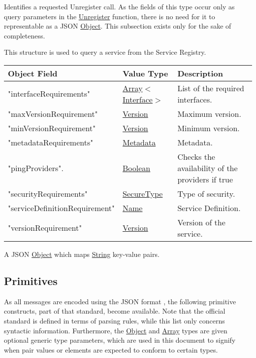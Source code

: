 \documentclass[a4paper]{arrowhead}
\newcommand{\oref}[1]{{\textcolor{ArrowheadBlue}{\hyperref[sec:operations:#1]{#1}}}}
\newcommand{\pref}[1]{{\textcolor{ArrowheadGrey}{\hyperref[sec:model:primitives:#1]{#1}}}}
\begin{document}

Identifies a requested Unregister call.
As the fields of this type occur only as query parameters in the \oref{Unregister} function, there is no need for it to representable as a JSON \pref{Object}.
This subsection exists only for the sake of completeness.


This structure is used to query a service from the Service Registry.

\begin{table}[ht!]
\begin{tabularx}{\textwidth}{| p{5cm} | p{3.5cm} | X |} \hline
\rowcolor{gray!33} Object Field & Value Type      & Description \\ \hline
"interfaceRequirements"                   & \pref{Array}$<$\pref{Interface}$>$     & List of the required interfaces. \\ \hline
"maxVersionRequirement"                & \pref{Version}     & Maximum version. \\ \hline
"minVersionRequirement"                & \pref{Version}     & Minimum version. \\ \hline
"metadataRequirements"                  & \pref{Metadata}     & Metadata. \\ \hline
"pingProviders".                    & \pref{Boolean} & Checks the availability of the providers if true \\ \hline
"securityRequirements"                    &\pref{SecureType}  & Type of security. \\ \hline
"serviceDefinitionRequirement"         &\pref{Name}        & Service Definition. \\ \hline
"versionRequirement"                   &\pref{Version}     & Version of the service. \\ \hline
\end{tabularx}
\end{table}


A JSON \pref{Object} which maps \pref{String} key-value pairs.

\subsection{Primitives}
\label{sec:model:primitives}

As all messages are encoded using the JSON format \cite{bray2014json}, the following primitive constructs, part of that standard, become available.
Note that the official standard is defined in terms of parsing rules, while this list only concerns syntactic information.
Furthermore, the \pref{Object} and \pref{Array} types are given optional generic type parameters, which are used in this document to signify when pair values or elements are expected to conform to certain types. 
\end{document}
